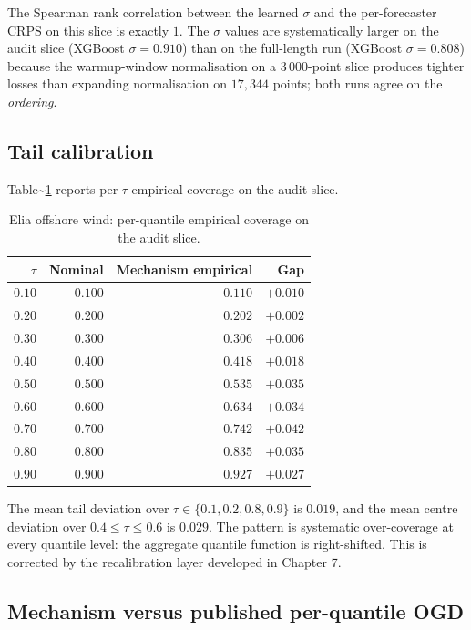 \documentclass[
  11pt,
  a4paper,
  oneside]{report}
\begin{document}
The Spearman rank correlation between the learned \(\sigma\) and the
per-forecaster CRPS on this slice is exactly \(1\). The \(\sigma\)
values are systematically larger on the audit slice (XGBoost
\(\sigma = 0.910\)) than on the full-length run (XGBoost
\(\sigma = 0.808\)) because the warmup-window normalisation on a
\(3\,000\)-point slice produces tighter losses than expanding
normalisation on \(17{,}344\) points; both runs agree on the
\emph{ordering}.

\subsection{Tail calibration}\label{tail-calibration}

Table\textasciitilde{}\ref{tab:wind-audit-coverage} reports per-\(\tau\)
empirical coverage on the audit slice.

\begin{table}[h]
\centering
\small
\begin{tabular}{rrrr}
\toprule
$\tau$ & Nominal & Mechanism empirical & Gap \\
\midrule
$0.10$ & $0.100$ & $0.110$ & $+0.010$ \\
$0.20$ & $0.200$ & $0.202$ & $+0.002$ \\
$0.30$ & $0.300$ & $0.306$ & $+0.006$ \\
$0.40$ & $0.400$ & $0.418$ & $+0.018$ \\
$0.50$ & $0.500$ & $0.535$ & $+0.035$ \\
$0.60$ & $0.600$ & $0.634$ & $+0.034$ \\
$0.70$ & $0.700$ & $0.742$ & $+0.042$ \\
$0.80$ & $0.800$ & $0.835$ & $+0.035$ \\
$0.90$ & $0.900$ & $0.927$ & $+0.027$ \\
\bottomrule
\end{tabular}
\caption{Elia offshore wind: per-quantile empirical coverage on the
audit slice.}
\label{tab:wind-audit-coverage}
\end{table}

The mean tail deviation over \(\tau \in \{0.1, 0.2, 0.8, 0.9\}\) is
\(0.019\), and the mean centre deviation over \(0.4 \leq \tau \leq 0.6\)
is \(0.029\). The pattern is systematic over-coverage at every quantile
level: the aggregate quantile function is right-shifted. This is
corrected by the recalibration layer developed in Chapter 7.

\subsection{Mechanism versus published per-quantile
OGD}\label{mechanism-versus-published-per-quantile-ogd}
\end{document}
